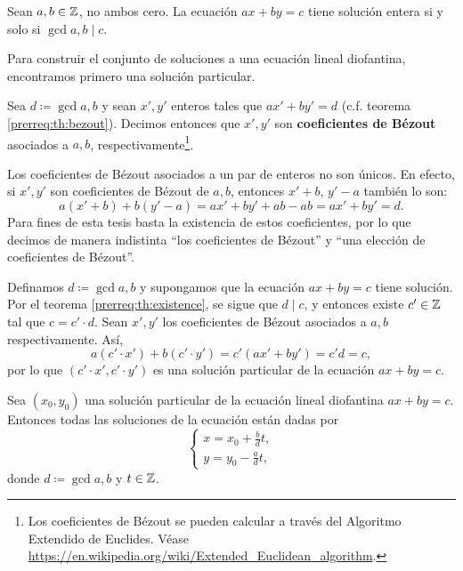 \begin{theorem}[Existencia]
	\label{prerreq:th:existence}
	Sean $a, b \in \mathbb{Z}$, no ambos cero. La ecuación $ax + by = c$ tiene solución entera si y solo si
	$\gcd{a, b} \mid c$.
\end{theorem}

Para construir el conjunto de soluciones a una ecuación lineal diofantina, encontramos primero una
solución particular.
\begin{definition}
	\label{prerreq:def:bezout}
	Sea $d \coloneq \gcd{a, b}$ y sean $x', y'$ enteros tales que $ax' + by' = d$ (c.f. teorema
	\ref{prerreq:th:bezout}). Decimos entonces que $x', y'$ son \textbf{coeficientes de Bézout} asociados a
	$a, b$, respectivamente\footnote{
		Los coeficientes de Bézout se pueden calcular a través del Algoritmo Extendido de Euclides.
		Véase \url{https://en.wikipedia.org/wiki/Extended_Euclidean_algorithm}.
	}.
\end{definition}

\begin{observation}
	Los coeficientes de Bézout asociados a un par de enteros no son únicos. En efecto, si $x', y'$
	son coeficientes de Bézout de $a, b$, entonces $x' + b$, $y' - a$ también lo son:
	\begin{equation*}
		a(x' + b) + b(y' - a) = ax' + by' + ab - ab = ax' + by' = d.
	\end{equation*}
	Para fines de esta tesis basta la existencia de estos coeficientes, por lo que decimos de manera
	indistinta ``los coeficientes de Bézout'' y ``una elección de coeficientes de Bézout''.
\end{observation}

Definamos $d \coloneq \gcd{a, b}$ y supongamos que la ecuación $ax + by = c$ tiene solución.
Por el teorema \ref{prerreq:th:existence}, se sigue que $d \mid c$, y entonces existe $c' \in \mathbb{Z}$
tal que $c = c' \cdot d$. Sean $x', y'$ los coeficientes de Bézout asociados a $a, b$
respectivamente. Así,
\begin{equation*}
	a(c' \cdot x') + b(c' \cdot y') = c'(ax' + by') = c'd = c,
\end{equation*}
por lo que $(c' \cdot x', c' \cdot y')$ es una solución particular de la ecuación $ax + by = c$.

\begin{theorem}[Construcción]
	\label{prerreq:th:construction}
	Sea $(x_0, y_0)$ una solución particular de la ecuación lineal diofantina $ax + by = c$.
	Entonces todas las soluciones de la ecuación están dadas por
	\begin{equation}
		\label{prerreq:eq:construction}
		\begin{cases}
			x = x_0 + \frac{b}{d}t, \\
			y = y_0 - \frac{a}{d}t,
		\end{cases}
	\end{equation}
	donde $d \coloneq \gcd{a, b}$ y $t \in \mathbb{Z}$.
\end{theorem}

